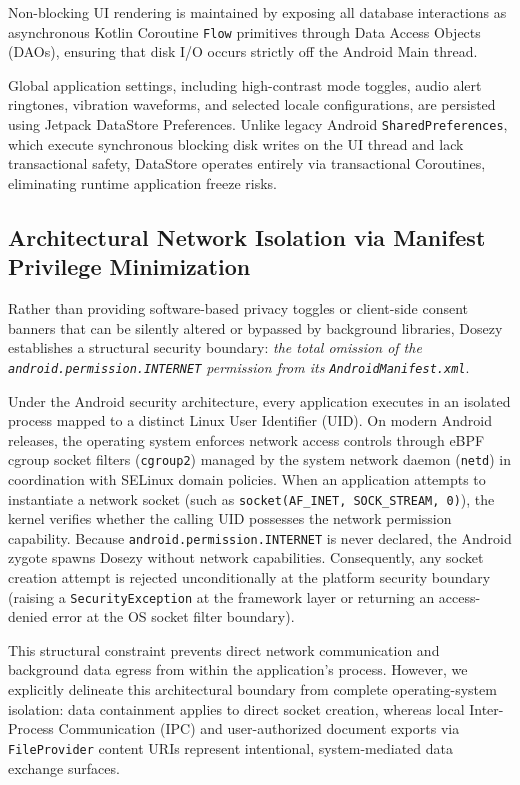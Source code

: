\documentclass[11pt,a4paper]{article}
\begin{document}
Non-blocking UI rendering is maintained by exposing all database interactions as asynchronous Kotlin Coroutine \texttt{Flow} primitives through Data Access Objects (DAOs), ensuring that disk I/O occurs strictly off the Android Main thread.

Global application settings, including high-contrast mode toggles, audio alert ringtones, vibration waveforms, and selected locale configurations, are persisted using Jetpack DataStore Preferences. Unlike legacy Android \texttt{SharedPreferences}, which execute synchronous blocking disk writes on the UI thread and lack transactional safety, DataStore operates entirely via transactional Coroutines, eliminating runtime application freeze risks.

\subsection{Architectural Network Isolation via Manifest Privilege Minimization}

Rather than providing software-based privacy toggles or client-side consent banners that can be silently altered or bypassed by background libraries, Dosezy establishes a structural security boundary: \emph{the total omission of the \texttt{android.permission.INTERNET} permission from its \texttt{AndroidManifest.xml}}.

Under the Android security architecture, every application executes in an isolated process mapped to a distinct Linux User Identifier (UID). On modern Android releases, the operating system enforces network access controls through eBPF cgroup socket filters (\texttt{cgroup2}) managed by the system network daemon (\texttt{netd}) in coordination with SELinux domain policies. When an application attempts to instantiate a network socket (such as \texttt{socket(AF\_INET, SOCK\_STREAM, 0)}), the kernel verifies whether the calling UID possesses the network permission capability. Because \texttt{android.permission.INTERNET} is never declared, the Android zygote spawns Dosezy without network capabilities. Consequently, any socket creation attempt is rejected unconditionally at the platform security boundary (raising a \texttt{SecurityException} at the framework layer or returning an access-denied error at the OS socket filter boundary).

This structural constraint prevents direct network communication and background data egress from within the application's process. However, we explicitly delineate this architectural boundary from complete operating-system isolation: data containment applies to direct socket creation, whereas local Inter-Process Communication (IPC) and user-authorized document exports via \texttt{FileProvider} content URIs represent intentional, system-mediated data exchange surfaces.
\end{document}
